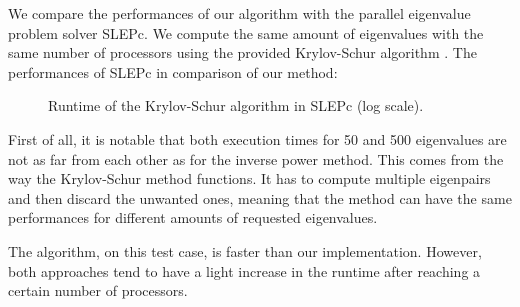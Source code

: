 We compare the performances of our algorithm with the parallel eigenvalue problem solver SLEPc.
We compute the same amount of eigenvalues with the same number of processors using the provided Krylov-Schur algorithm \cite{stewart_krylovschur_2002}.
The performances of SLEPc in comparison of our method:

\begin{figure}[H]
  \centering
  
  \caption{Runtime of the Krylov-Schur algorithm in SLEPc (log scale).}
\end{figure}

First of all, it is notable that both execution times for 50 and 500 eigenvalues are not as far from each other as for the inverse power method.
This comes from the way the Krylov-Schur method functions.
It has to compute multiple eigenpairs and then discard the unwanted ones, meaning that the method can have the same performances for different amounts of requested eigenvalues.

The algorithm, on this test case, is faster than our implementation.
However, both approaches tend to have a light increase in the runtime after reaching a certain number of processors.
